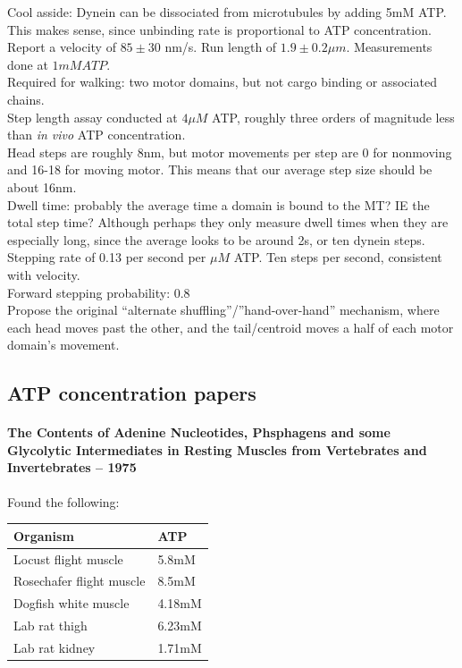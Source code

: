 \documentclass[10pt]{article} %
\begin{document}
Cool asside: Dynein can be dissociated from microtubules by adding 5mM ATP. This makes sense, since unbinding rate is proportional to ATP concentration.\\

Report a velocity of $85\pm30$ nm/s. Run length of $1.9\pm0.2\mu m$. Measurements done at $1mM ATP$.\\

Required for walking: two motor domains, but not cargo binding or associated chains.\\

Step length assay conducted at $4 \mu M$ ATP, roughly three orders of magnitude less than \textit{in vivo} ATP concentration.\\ 

Head steps are roughly 8nm, but motor movements per step are 0 for nonmoving and 16-18 for moving motor. This means that our average step size should be about 16nm.\\

Dwell time: probably the average time a domain is bound to the MT? IE the total step time? Although perhaps they only measure dwell times when they are especially long, since the average looks to be around 2s, or ten dynein steps.\\

Stepping rate of 0.13 per second per $\mu M$ ATP. Ten steps per second, consistent with velocity.\\

Forward stepping probability: 0.8\\

Propose the original ``alternate shuffling''/''hand-over-hand'' mechanism, where each head moves past the other, and the tail/centroid moves a half of each motor domain's movement.\\

\subsection{ATP concentration papers}
\paragraph{The Contents of Adenine Nucleotides, Phsphagens and some Glycolytic Intermediates in Resting Muscles from Vertebrates and Invertebrates -- 1975}

Found the following:

\begin{center}
  \begin{tabular}{| l | l |}
    \hline
    Organism & ATP\\ \hline
    Locust flight muscle & 5.8mM\\ \hline
    Rosechafer flight muscle & 8.5mM\\ \hline
    Dogfish white muscle & 4.18mM\\ \hline
    Lab rat thigh & 6.23mM\\ \hline
    Lab rat kidney & 1.71mM\\ \hline
  \end{tabular}
\end{center}
\end{document}
